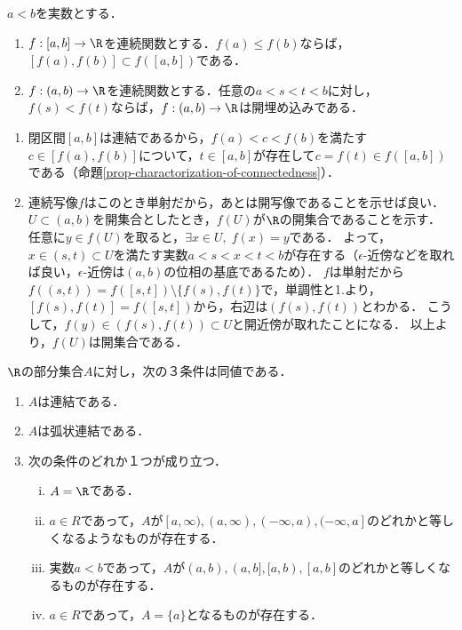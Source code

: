 \documentclass[uplatex,dvipdfmx]{jsreport}
\begin{document}
\begin{corollary}[区間上の単調写像は開埋め込み]\label{cor-monotone-map-over-intervals}
    $a<b$を実数とする．
    \begin{enumerate}
        \item $f:[a,b]\to\R$を連続関数とする．$f(a)\le f(b)$ならば，$[f(a),f(b)]\subset f([a,b])$である．
        \item $f:(a,b)\to\R$を連続関数とする．任意の$a<s<t<b$に対し，$f(s)<f(t)$ならば，$f:(a,b)\to\R$は開埋め込みである．
    \end{enumerate}
\end{corollary}
\begin{Proof}\mbox{}
    \begin{enumerate}
        \item 閉区間$[a,b]$は連結であるから，$f(a)<c<f(b)$を満たす$c\in[f(a),f(b)]$について，$t\in[a,b]$が存在して$c=f(t)\in f([a,b])$である（命題\ref{prop-charactorization-of-connectedness}）．
        \item 連続写像$f$はこのとき単射だから，あとは開写像であることを示せば良い．
        $U\subset(a,b)$を開集合としたとき，$f(U)$が$\R$の開集合であることを示す．
        任意に$y\in f(U)$を取ると，$\exists x\in U,\; f(x)=y$である．
        よって，$x\in(s,t)\subset U$を満たす実数$a<s<x<t<b$が存在する（$\epsilon$-近傍などを取れば良い，$\epsilon$-近傍は$(a,b)$の位相の基底であるため）．
        $f$は単射だから$f((s,t))=f([s,t])\setminus\{f(s),f(t)\}$で，単調性と1.より，$[f(s),f(t)]=f([s,t])$から，右辺は$(f(s),f(t))$とわかる．
        こうして，$f(y)\in(f(s),f(t))\subset U$と開近傍が取れたことになる．
        以上より，$f(U)$は開集合である．
    \end{enumerate}
\end{Proof}

\begin{proposition}[$\R$の連結集合の分類]
    $\R$の部分集合$A$に対し，次の３条件は同値である．
    \begin{enumerate}
        \item $A$は連結である．
        \item $A$は弧状連結である．
        \item 次の条件のどれか１つが成り立つ．
        \begin{enumerate}[(i)]
            \item $A=\R$である．
            \item $a\in R$であって，$A$が$[a,\infty),(a,\infty),(-\infty,a),(-\infty,a]$のどれかと等しくなるようなものが存在する．
            \item 実数$a<b$であって，$A$が$(a,b),(a,b],[a,b),[a,b]$のどれかと等しくなるものが存在する．
            \item $a\in R$であって，$A=\{a\}$となるものが存在する．
        \end{enumerate}
    \end{enumerate}
\end{proposition}
\end{document}
